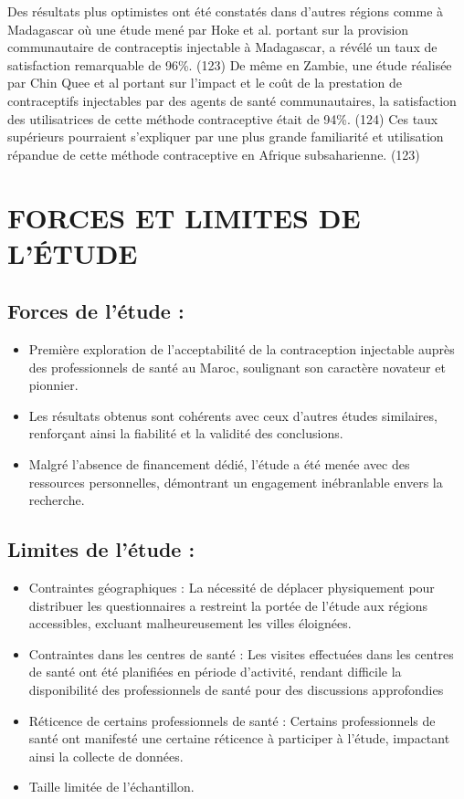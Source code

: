 \noindent Des résultats plus optimistes ont été constatés dans d’autres régions comme à Madagascar où une étude mené par Hoke et al. portant sur la provision communautaire de contraceptis injectable à Madagascar, a révélé un taux de satisfaction remarquable de 96\%. (123) De même en Zambie, une étude réalisée par Chin Quee et al portant sur l'impact et le coût de la prestation de contraceptifs injectables par des agents de santé communautaires, la satisfaction des utilisatrices de cette méthode contraceptive était de 94\%. (124) Ces taux supérieurs pourraient s'expliquer par une plus grande familiarité et utilisation répandue de cette méthode contraceptive en Afrique subsaharienne. (123)


\pagebreak

\section{FORCES ET LIMITES DE L’ÉTUDE}

\subsection{Forces de l’étude : }

\begin{itemize}
  \item Première exploration de l’acceptabilité de la contraception injectable auprès des professionnels de santé au Maroc, soulignant son caractère novateur et pionnier.
  \item Les résultats obtenus sont cohérents avec ceux d’autres études similaires, renforçant ainsi la fiabilité et la validité des conclusions. 
  \item	Malgré l’absence de financement dédié, l’étude a été menée avec des ressources personnelles, démontrant un engagement inébranlable envers la recherche. 
\end{itemize}


\subsection{Limites de l’étude :}

\begin{itemize}
  \item Contraintes géographiques : La nécessité de déplacer physiquement pour distribuer les questionnaires a restreint la portée de l’étude aux régions accessibles, excluant malheureusement les villes éloignées. 
  \item Contraintes dans les centres de santé : Les visites effectuées dans les centres de santé ont été planifiées en période d’activité, rendant difficile la disponibilité des professionnels de santé pour des discussions approfondies 
  \item Réticence de certains professionnels de santé : Certains professionnels de santé ont manifesté une certaine réticence à participer à l’étude, impactant ainsi la collecte de données.   
  \item	Taille limitée de l’échantillon.           
\end{itemize}


